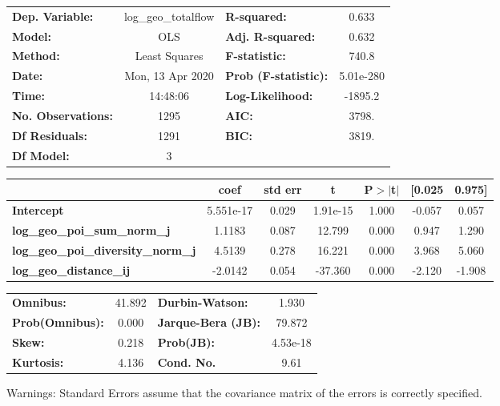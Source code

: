 \begin{center}
\begin{tabular}{lclc}
\toprule
\textbf{Dep. Variable:}                    & log\_geo\_totalflow & \textbf{  R-squared:         } &     0.633   \\
\textbf{Model:}                            &         OLS         & \textbf{  Adj. R-squared:    } &     0.632   \\
\textbf{Method:}                           &    Least Squares    & \textbf{  F-statistic:       } &     740.8   \\
\textbf{Date:}                             &   Mon, 13 Apr 2020  & \textbf{  Prob (F-statistic):} & 5.01e-280   \\
\textbf{Time:}                             &       14:48:06      & \textbf{  Log-Likelihood:    } &   -1895.2   \\
\textbf{No. Observations:}                 &          1295       & \textbf{  AIC:               } &     3798.   \\
\textbf{Df Residuals:}                     &          1291       & \textbf{  BIC:               } &     3819.   \\
\textbf{Df Model:}                         &             3       & \textbf{                     } &             \\
\bottomrule
\end{tabular}
\begin{tabular}{lcccccc}
                                           & \textbf{coef} & \textbf{std err} & \textbf{t} & \textbf{P$> |$t$|$} & \textbf{[0.025} & \textbf{0.975]}  \\
\midrule
\textbf{Intercept}                         &    5.551e-17  &        0.029     &  1.91e-15  &         1.000        &       -0.057    &        0.057     \\
\textbf{log\_geo\_poi\_sum\_norm\_j}       &       1.1183  &        0.087     &    12.799  &         0.000        &        0.947    &        1.290     \\
\textbf{log\_geo\_poi\_diversity\_norm\_j} &       4.5139  &        0.278     &    16.221  &         0.000        &        3.968    &        5.060     \\
\textbf{log\_geo\_distance\_ij}            &      -2.0142  &        0.054     &   -37.360  &         0.000        &       -2.120    &       -1.908     \\
\bottomrule
\end{tabular}
\begin{tabular}{lclc}
\textbf{Omnibus:}       & 41.892 & \textbf{  Durbin-Watson:     } &    1.930  \\
\textbf{Prob(Omnibus):} &  0.000 & \textbf{  Jarque-Bera (JB):  } &   79.872  \\
\textbf{Skew:}          &  0.218 & \textbf{  Prob(JB):          } & 4.53e-18  \\
\textbf{Kurtosis:}      &  4.136 & \textbf{  Cond. No.          } &     9.61  \\
\bottomrule
\end{tabular}
\end{center}

Warnings: \newline
 [1] Standard Errors assume that the covariance matrix of the errors is correctly specified.